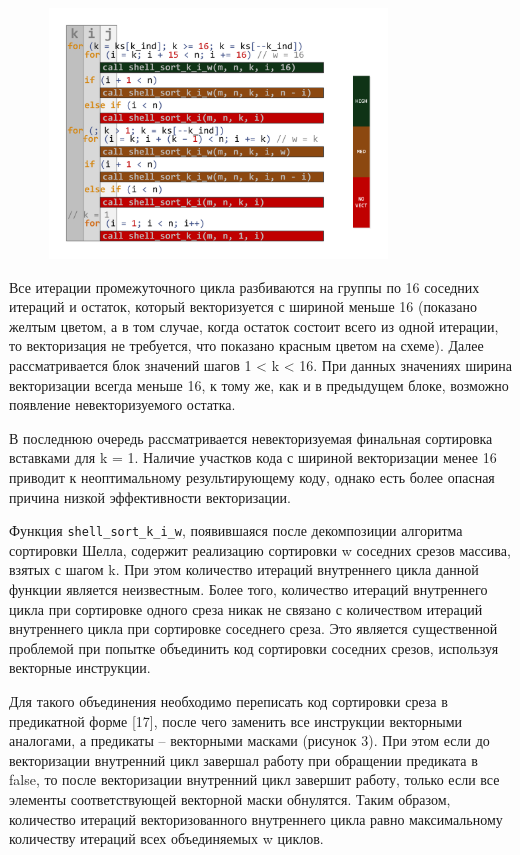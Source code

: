 \begin{figure}[ht]
	\centering
		\includegraphics[width=0.8\textwidth]{./pics/text_4_vec_irreg/code_decomp.pdf}
	\caption{}
	\label{fig:text_4_vec_irreg_code_decomp}
\end{figure}

Все итерации промежуточного цикла разбиваются на группы по 16 соседних итераций и остаток, который векторизуется с шириной меньше 16 (показано желтым цветом, а в том случае, когда остаток состоит всего из одной итерации, то векторизация не требуется, что показано красным цветом на схеме).
Далее рассматривается блок значений шагов 1 < k < 16.
При данных значениях ширина векторизации всегда меньше 16, к тому же, как и в предыдущем блоке, возможно появление невекторизуемого остатка.

В последнюю очередь рассматривается невекторизуемая финальная сортировка вставками для k = 1. Наличие участков кода с шириной векторизации менее 16 приводит к неоптимальному результирующему коду, однако есть более опасная причина низкой эффективности векторизации.

Функция \texttt{shell\_sort\_k\_i\_w}, появившаяся после декомпозиции алгоритма сортировки Шелла, содержит реализацию сортировки w соседних срезов массива, взятых с шагом k.
При этом количество итераций внутреннего цикла данной функции является неизвестным.
Более того, количество итераций внутреннего цикла при сортировке одного среза никак не связано с количеством итераций внутреннего цикла при сортировке соседнего среза.
Это является существенной проблемой при попытке объединить код сортировки соседних срезов, используя векторные инструкции.

Для такого объединения необходимо переписать код сортировки среза в предикатной форме [17], после чего заменить все инструкции векторными аналогами, а предикаты – векторными масками (рисунок 3).
При этом если до векторизации внутренний цикл завершал работу при обращении предиката в false, то после векторизации внутренний цикл завершит работу, только если все элементы соответствующей векторной маски обнулятся.
Таким образом, количество итераций векторизованного внутреннего цикла равно максимальному количеству итераций всех объединяемых w циклов.

